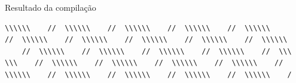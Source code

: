 \begin{example}{Resultado da compilação}
\begin{verbatim}
\\\\\\    //  \\\\\\    //  \\\\\\    //  \\\\\\    //  \\\\\\    
//  \\\\\\    //  \\\\\\    //  \\\\\\    //  \\\\\\    //  \\\\\\
    //  \\\\\\    //  \\\\\\    //  \\\\\\    //  \\\\\\    //  \\\
\\\    //  \\\\\\    //  \\\\\\    //  \\\\\\    //  \\\\\\    //  
\\\\\\    //  \\\\\\    //  \\\\\\    //  \\\\\\    //  \\\\\\    /

\end{verbatim}
\end{example}
